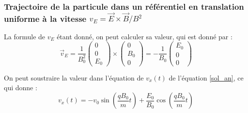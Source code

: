 \documentclass[a4paper,12pt,twoside]{article}
\begin{document}
\subsubsection{Trajectoire de la particule dans un r\'ef\'erentiel en translation uniforme \`a la vitesse $v_E = \Vec{E}\times\Vec{B}/B^2$}

La formule de $v_E$ \'etant donn\'e, on peut calculer sa valeur, qui est donn\'e par : 
\begin{equation}\label{v_e}
\Vec{v}_E = \frac{1}{B_0^2}\begin{pmatrix}0 \\ 0 \\ E_0 \end{pmatrix}\times\begin{pmatrix}0 \\ B_0 \\ 0 \end{pmatrix} = -\frac{1}{B_0}\begin{pmatrix}E_0 \\ 0 \\ 0 \end{pmatrix}
\end{equation}

On peut soustraire la valeur dans l'\'equation de $v_x(t)$ de l'\'equation \ref{sol_an}, ce qui donne :
\begin{equation}\label{sol v_e}
v_x(t) = - v_0\sin(\frac{qB_0}{m}t) + \frac{E_0}{B_0}\cos(\frac{qB_0}{m}t)
\end{equation}
\end{document}
